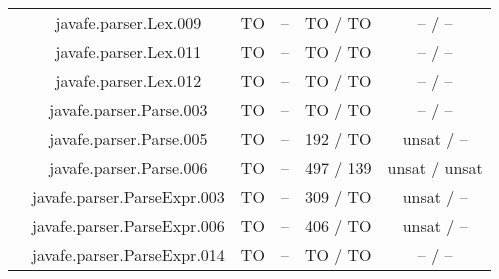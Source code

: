\begin{table}[htbp]
\begin{minipage}{0.60\textwidth}
{\begin{tabular}[c]{c c!{\vrule width 1.5pt}c|c!{\vrule width 1.5pt}c|c|}
		 	& javafe.parser.Lex.009		    			     & TO   & --      & TO  / TO       & --    / --        \\
		 	& javafe.parser.Lex.011		    			     & TO   & --      & TO  / TO       & --    / --        \\
 			& javafe.parser.Lex.012    				     & TO   & --      & TO  / TO       & --    / --        \\
 			& javafe.parser.Parse.003		  		     & TO   & --      & TO  / TO       & --    / --        \\
 			& javafe.parser.Parse.005		   		     & TO   & --      & 192 / TO       & unsat / --        \\
 			& javafe.parser.Parse.006		   		     & TO   & --      & 497 / 139      & unsat / unsat     \\
 			& javafe.parser.ParseExpr.003		   		     & TO   & --      & 309 / TO       & unsat / --        \\
		 	& javafe.parser.ParseExpr.006	    			     & TO   & --      & 406 / TO       & unsat / --        \\
 			& javafe.parser.ParseExpr.014		   		     & TO   & --      & TO  / TO       & --    / --        \\

\end{tabular}}
\end{minipage}
\end{table}
